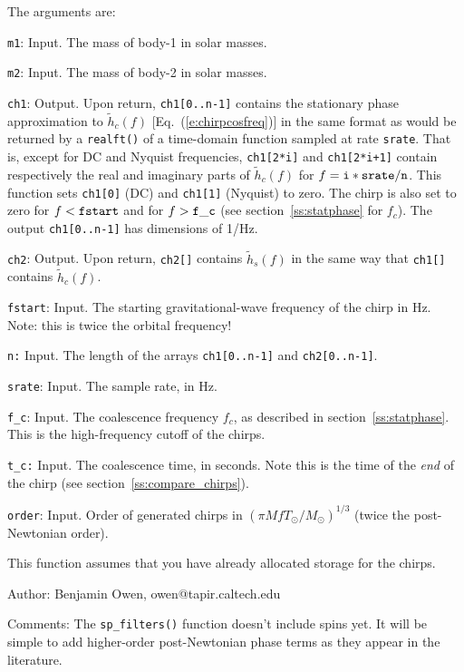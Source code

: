 The arguments are:
\begin{description}
\item{\tt m1}: Input.  The mass of body-1 in solar masses.
\item{\tt m2}: Input.  The mass of body-2 in solar masses.
\item{\tt ch1}: Output.  Upon return, {\tt ch1[0..n-1]} contains
   the stationary phase approximation to $\tilde{h}_c(f)$
   [Eq.~(\ref{e:chirpcosfreq})]
   in the same format as would be returned by a
   {\tt realft()} of a time-domain function sampled at rate {\tt srate}.
   That is, except for DC and Nyquist frequencies,
   {\tt ch1[2*i]} and {\tt ch1[2*i+1]} contain respectively
   the real and imaginary parts of $\tilde{h}_c(f)$
   for $f={\tt i*srate/n}$.
   This function sets {\tt ch1[0]} (DC) and {\tt ch1[1]} (Nyquist) to zero.
   The chirp is also set to zero for $f<{\tt fstart}$ and for $f>{\tt f\_c}$
   (see section~\ref{ss:statphase} for $f_c$).
   The output {\tt ch1[0..n-1]} has dimensions of 1/Hz.
\item{\tt ch2}: Output.  Upon return, {\tt ch2[]} contains
   $\tilde{h}_s(f)$ in the same way that {\tt ch1[]} contains $\tilde{h}_c(f)$.
\item{\tt fstart}: Input.  The starting gravitational-wave frequency of the
   chirp in Hz.  Note: this is twice the orbital frequency!
\item{\tt n:} Input.  The length of the arrays {\tt ch1[0..n-1]} and
   {\tt    ch2[0..n-1]}.
\item{\tt srate}: Input.  The sample rate, in Hz.
\item{\tt f\_c}: Input.  The coalescence frequency $f_c$, as described in
   section~\ref{ss:statphase}.  This is the high-frequency cutoff of the
   chirps.
\item{\tt t\_c:} Input.  The coalescence time, in seconds.  Note this is the
   time of the {\em end} of the chirp (see section~\ref{ss:compare_chirps}).
\item{\tt order}: Input.
   Order of generated chirps in $(\pi MfT_\odot/M_\odot)^{1/3}$
   (twice the post-Newtonian order).
\end{description}

This function assumes that you have already allocated storage for
the chirps.

\begin{description}
\item{Author:}
Benjamin Owen, owen@tapir.caltech.edu
\item{Comments:} The {\tt sp\_filters()} function doesn't include
  spins yet.  It will be simple to add higher-order post-Newtonian
  phase terms as they appear in the literature.
\end{description}
\clearpage

